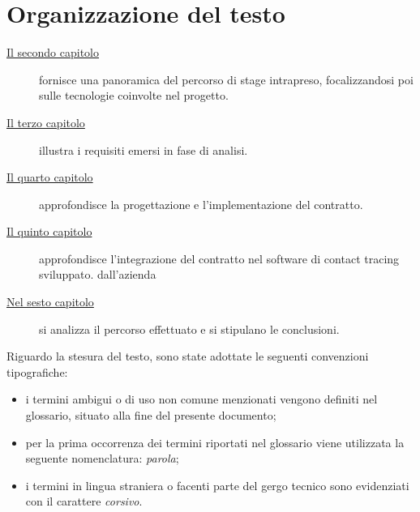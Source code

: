 \section{Organizzazione del testo}

\begin{description}
    \item[{\hyperref[cap:descrizione-stage]{Il secondo capitolo}}] fornisce una panoramica del percorso di stage intrapreso, focalizzandosi poi sulle tecnologie coinvolte nel progetto.
    
    \item[{\hyperref[cap:analisi-requisiti]{Il terzo capitolo}}] illustra i requisiti emersi in fase di analisi.
    
    \item[{\hyperref[cap:progettazione-codifica]{Il quarto capitolo}}] approfondisce la progettazione e l'implementazione del contratto.
    
    \item[{\hyperref[cap:integrazione-synctrace]{Il quinto capitolo}}] approfondisce l'integrazione del contratto nel software di contact tracing sviluppato. dall'azienda
    
    \item[{\hyperref[cap:conclusioni]{Nel sesto capitolo}}] si analizza il percorso effettuato e si stipulano le conclusioni.
\end{description}

Riguardo la stesura del testo, sono state adottate le seguenti convenzioni tipografiche:
\begin{itemize}
	\item i termini ambigui o di uso non comune menzionati vengono definiti nel glossario, situato alla fine del presente documento;
	\item per la prima occorrenza dei termini riportati nel glossario viene utilizzata la seguente nomenclatura: \emph{parola}\glsfirstoccur;
	\item i termini in lingua straniera o facenti parte del gergo tecnico sono evidenziati con il carattere \emph{corsivo}.
\end{itemize}